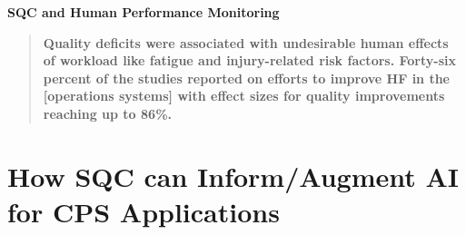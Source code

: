 \documentclass[aspectratio=43]{beamer}
\begin{document}
\begin{frame}[t]{\textbf{SQC and Human Performance Monitoring}}
{  \begin{quotation}
      \noindent \textbf{\textcolor{miamired}{Quality deficits were associated with undesirable human effects of workload like fatigue and injury-related risk factors. Forty-six percent of the studies reported on efforts to improve HF in the [operations systems] with effect sizes for quality improvements reaching up to 86\%.}}
  \end{quotation}
  }
  
\end{frame}

\section{How SQC can Inform/Augment AI for CPS Applications}

\end{document}
